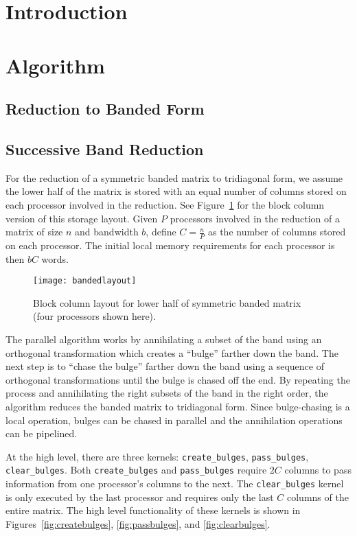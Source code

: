 \documentclass[10pt]{article}
\begin{document}
\section{Introduction}

\section{Algorithm}

\subsection{Reduction to Banded Form}

\subsection{Successive Band Reduction}

For the reduction of a symmetric banded matrix to tridiagonal form, we assume the lower half of the matrix is stored with an equal number of columns stored on each processor involved in the reduction.  See Figure~\ref{fig:bandedlayout} for the block column version of this storage layout.  Given $P$ processors involved in the reduction of a matrix of size $n$ and bandwidth $b$, define $C = \frac{n}{P}$ as the number of columns stored on each processor.  The initial local memory requirements for each processor is then $bC$ words.

\begin{figure}
	\centering
	\texttt{[image: bandedlayout]}
	\caption{Block column layout for lower half of symmetric banded matrix (four processors shown here).}
	\label{fig:bandedlayout}
\end{figure}

The parallel algorithm works by annihilating a subset of the band using an orthogonal transformation which creates a ``bulge'' farther down the band.  The next step is to ``chase the bulge'' farther down the band using a sequence of orthogonal transformations until the bulge is chased off the end.  By repeating the process and annihilating the right subsets of the band in the right order, the algorithm reduces the banded matrix to tridiagonal form.  Since bulge-chasing is a local operation, bulges can be chased in parallel and the annihilation operations can be pipelined.

At the high level, there are three kernels: {\tt create\_bulges}, {\tt pass\_bulges}, {\tt clear\_bulges}.  Both {\tt create\_bulges} and {\tt pass\_bulges} require $2C$ columns to pass information from one processor's columns to the next.  The {\tt clear\_bulges} kernel is only executed by the last processor and requires only the last $C$ columns of the entire matrix.  The high level functionality of these kernels is shown in Figures~\ref{fig:createbulges}, \ref{fig:passbulges}, and \ref{fig:clearbulges}.
\end{document}
